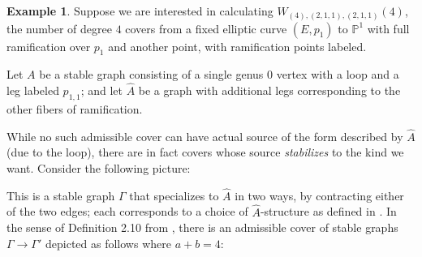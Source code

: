 \documentclass[thesis]{thesis-umich}           %
\renewcommand{\P}{\mathbb P}
\theoremstyle{definition}
\newtheorem{eg}[thm]{Example}
\begin{document}
\begin{eg}
  \label{eg:genusreduction}
  Suppose we are interested in calculating $W_{(4),(2,1,1),(2,1,1)}(4)$, the number of degree $4$ covers from a fixed elliptic curve $(E,p_1)$ to $\P^1$ with full ramification over $p_1$ and another point, with ramification points labeled.
  
  Let $A$ be a stable graph consisting of a single genus $0$ vertex with
  a loop and a leg labeled $p_{1,1}$; and let $\hat A$ be a graph with
  additional legs corresponding to the other fibers of ramification.

  While no such admissible cover
  can have actual source of the form described by $\hat A$ (due to the loop), there are in fact
  covers whose source {\it stabilizes} to the kind we want.
  Consider the following picture:


  This is a stable graph $\Gamma$ that specializes to
  $\hat A$ in two ways, by contracting either of
  the two edges; each corresponds to a choice of $\hat A$-structure
  as defined in \cite{Schmitt}.
  In the sense of Definition 2.10 from \cite{Lian}, there is an admissible cover of stable graphs $\Gamma\to\Gamma'$ depicted as follows where $a+b=4$:


\end{eg}
\end{document}
